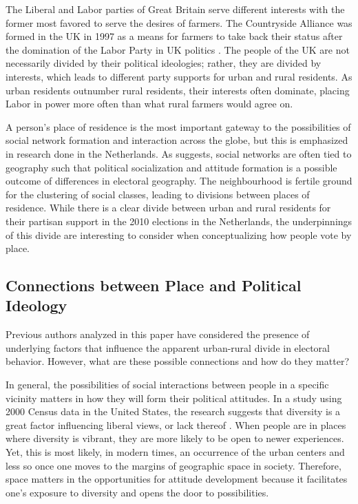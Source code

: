 \documentclass[12pt, titlepage]{article}
\begin{document}
The Liberal and Labor parties of Great Britain serve different interests with the former most favored to serve the desires of farmers. The Countryside Alliance was formed in the UK in 1997 as a means for farmers to take back their status after the domination of the Labor Party in UK politics \citep{benton_ruralurban_2007}. The people of the UK are not necessarily divided by their political ideologies; rather, they are divided by interests, which leads to different party supports for urban and rural residents. As urban residents outnumber rural residents, their interests often dominate, placing Labor in power more often than what rural farmers would agree on.

A person's place of residence is the most important gateway to the possibilities of social network formation and interaction across the globe, but this is emphasized in research done in the Netherlands. As \cite{van_gent_right-wing_2014} suggests, social networks are often tied to geography such that political socialization and attitude formation is a possible outcome of differences in electoral geography. The neighbourhood is fertile ground for the clustering of social classes, leading to divisions between places of residence. While there is a clear divide between urban and rural residents for their partisan support in the 2010 elections in the Netherlands, the underpinnings of this divide are interesting to consider when conceptualizing how people vote by place.

\subsection{Connections between Place and Political Ideology}

Previous authors analyzed in this paper have considered the presence of underlying factors that influence the apparent urban-rural divide in electoral behavior. However, what are these possible connections and how do they matter? 

In general, the possibilities of social interactions between people in a specific vicinity  matters in how they will form their political attitudes. In a study using 2000 Census data in the United States, the research suggests that diversity is a great factor influencing liberal views, or lack thereof \citep{williamson_sprawl_2008}. When people are in places where diversity is vibrant, they are more likely to be open to newer experiences. Yet, this is most likely, in modern times, an occurrence of the urban centers and less so once one moves to the margins of geographic space in society. Therefore, space matters in the opportunities for attitude development because it facilitates one's exposure to diversity and opens the door to possibilities.
\end{document}
